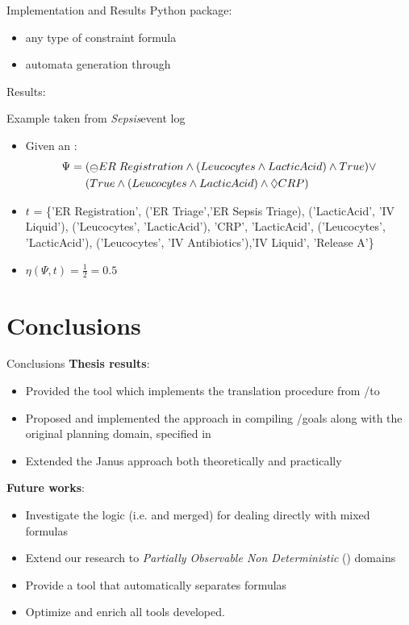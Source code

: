 \documentclass[10pt]{beamer}
\begin{document}
\begin{frame}{Implementation and Results}
\janus Python package:
	\begin{itemize}
		\item any type of constraint formula
		\item automata generation through \LTLfToDFA
	\end{itemize}
Results:
\begin{exampleblock}{Example taken from \textit{Sepsis}\footnotemark event log}
\begin{itemize}
\item Given an \rcon\xspace:
\begin{align*}
\Psi = \;& (\Yesterday ER\; Registration \lAND (Leucocytes \lAND LacticAcid) \lAND True) \lOR\\
& (True \lAND (Leucocytes \lAND LacticAcid) \lAND \Diamond CRP)
\end{align*}
\item $t$ = \{'ER Registration', ('ER Triage','ER Sepsis Triage), ('LacticAcid', 'IV Liquid'),  ('Leucocytes', 'LacticAcid'), 'CRP', 'LacticAcid', ('Leucocytes', 'LacticAcid'), ('Leucocytes', 'IV Antibiotics'),'IV Liquid', 'Release A'\}
\item $\eta(\Psi, t) = \tfrac{1}{2} = 0.5$
\end{itemize}
\end{exampleblock}
\end{frame}

\section{Conclusions}
\begin{frame}{Conclusions}
	\textbf{Thesis results}:
	\begin{itemize}
		\item Provided the \LTLfToDFA tool which implements the translation procedure from \LTLf/\PLTL to \DFA
		\item Proposed and implemented the \FONDFOR approach in compiling \LTLf/\PLTL goals along with the original planning domain, specified in \PDDL
		\item Extended the Janus approach both theoretically and practically
	\end{itemize}
	\vspace{0.5cm}
\textbf{Future works}:
	\begin{itemize}
		\item Investigate the \LTLp logic (i.e. \LTLf and \PLTL merged) for dealing directly with mixed formulas 
		\item Extend our research to \textit{Partially Observable Non Deterministic} (\POND) domains
		\item Provide a tool that automatically separates \LTLp formulas
		\item Optimize and enrich all tools developed.
	\end{itemize}
\end{frame}
\end{document}
